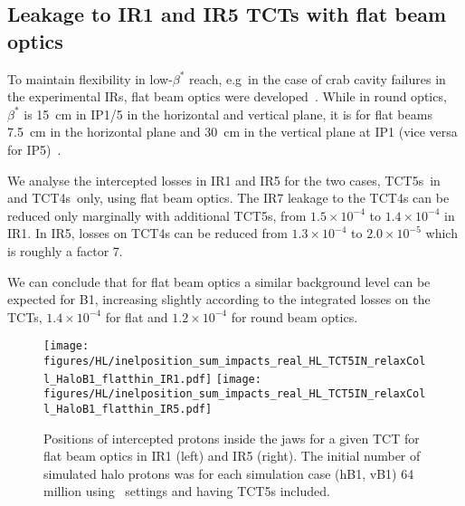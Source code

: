 
\subsection{Leakage to IR1 and IR5 TCTs with flat beam optics}

To maintain flexibility in low-$\beta^*$ reach, e.g~in the case of crab cavity failures in the experimental IRs, flat beam optics were developed~\cite{}. While in round optics, $\beta^*$ is 15~cm in IP1/5 in the horizontal and vertical plane, it is for flat beams 7.5~cm in the horizontal plane and 30~cm in the vertical plane at IP1 (vice versa for IP5)~\cite{opticsWebRef}. 

We analyse the intercepted losses in IR1 and IR5 for the two cases, TCT5s~in and TCT4s~only, using flat beam optics. The IR7 leakage to the TCT4s can be reduced only marginally with additional TCT5s, from $1.5 \times 10^{-4}$ to $1.4 \times 10^{-4}$ in IR1. In IR5, losses on TCT4s can be reduced from $1.3 \times 10^{-4}$ to $2.0 \times 10^{-5}$ which is roughly a factor 7. 

We can conclude that for flat beam optics a similar background level can be expected for B1, increasing slightly according to the integrated losses on the TCTs, $1.4 \times 10^{-4}$ for flat and $1.2 \times 10^{-4}$ for round beam optics.




\begin{figure}%
\begin{center}
  \texttt{[image: figures/HL/inelposition\_sum\_impacts\_real\_HL\_TCT5IN\_relaxColl\_HaloB1\_flatthin\_IR1.pdf]}
  \texttt{[image: figures/HL/inelposition\_sum\_impacts\_real\_HL\_TCT5IN\_relaxColl\_HaloB1\_flatthin\_IR5.pdf]}
\end{center}
 \caption{Positions of intercepted protons inside the jaws for a given TCT for flat beam optics in IR1 (left) and IR5 (right). The initial number of simulated halo protons was for each simulation case (hB1, vB1) 64 million using \twosigmaret~settings and having TCT5s included.
   \label{fig:inelflat}}
\end{figure}
